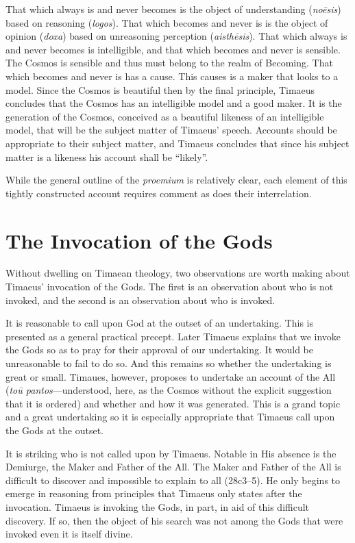That which always is and never becomes is the object of understanding (\emph{noēsis}) based on reasoning (\emph{logos}). That which becomes and never is is the object of opinion (\emph{doxa}) based on unreasoning perception (\emph{aisthēsis}). That which always is and never becomes is intelligible, and that which becomes and never is sensible. The Cosmos is sensible and thus must belong to the realm of Becoming. That which becomes and never is has a cause. This causes is a maker that looks to a model. Since the Cosmos is beautiful then by the final principle, Timaeus concludes that the Cosmos has an intelligible model and a good maker. It is the generation of the Cosmos, conceived as a beautiful likeness of an intelligible model, that will be the subject matter of Timaeus' speech. Accounts should be appropriate to their subject matter, and Timaeus concludes that since his subject matter is a likeness his account shall be ``likely''.

While the general outline of the \emph{proemium} is relatively clear, each element of this tightly constructed account requires comment as does their interrelation. 


\section{The Invocation of the Gods} %
\label{sec:the_invocation_of_the_gods}

Without dwelling on Timaean theology, two observations are worth making about Timaeus' invocation of the Gods. The first is an observation about who is not invoked, and the second is an observation about who is invoked.

It is reasonable to call upon God at the outset of an undertaking. This is presented as a general practical precept. Later Timaeus explains that we invoke the Gods so as to pray for their approval of our undertaking. It would be unreasonable to fail to do so. And this remains so whether the undertaking is great or small. Timaues, however, proposes to undertake an account of the All (\emph{toū pantos}---understood, here, as the Cosmos without the explicit suggestion that it is ordered) and whether and how it was generated. This is a grand topic and a great undertaking so it is especially appropriate that Timaeus call upon the Gods at the outset. 

It is striking who is not called upon by Timaeus. Notable in His absence is the Demiurge, the Maker and Father of the All. The Maker and Father of the All is difficult to discover and impossible to explain to all (28c3–5). He only begins to emerge in reasoning from principles that Timaeus only states after the invocation. Timaeus is invoking the Gods, in part, in aid of this difficult discovery. If so, then the object of his search was not among the Gods that were invoked even it is itself divine.

